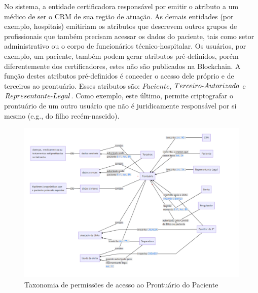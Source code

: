 \documentclass[a4paper,11pt]{article}
\begin{document}
No sistema, a entidade certificadora responsável por emitir o atributo a um médico de ser o CRM de sua região de atuação. As demais entidades (por exemplo, hospitais) emitiriam os atributos que descrevem outros grupos de profissionais que também precisam acessar os dados do paciente, tais como setor administrativo ou o corpo de funcionários técnico-hospitalar.
Os usuários, por exemplo, um paciente, também podem gerar atributos pré-definidos, porém diferentemente dos certificadores, estes não são publicados na Blockchain.
A função destes atributos pré-definidos é conceder o acesso dele próprio e de terceiros ao prontuário. %
Esses atributos são: $Paciente$, $Terceiro\textnormal{-}Autorizado$ e $Representante\textnormal{-}Legal$. %
Como exemplo, este último, permite criptografar o prontuário de um outro usuário que não é juridicamente responsável por si mesmo (e.g., do filho recém-nascido).


\begin{figure}[h]
  \centering
  \includegraphics[width=\textwidth]{images/taxonomia-de-permissoes.png}
  \caption{Taxonomia de permissões de acesso ao Prontuário do Paciente} %
  \label{fig:taxonomiaPermissoes}
\end{figure}

\end{document}
